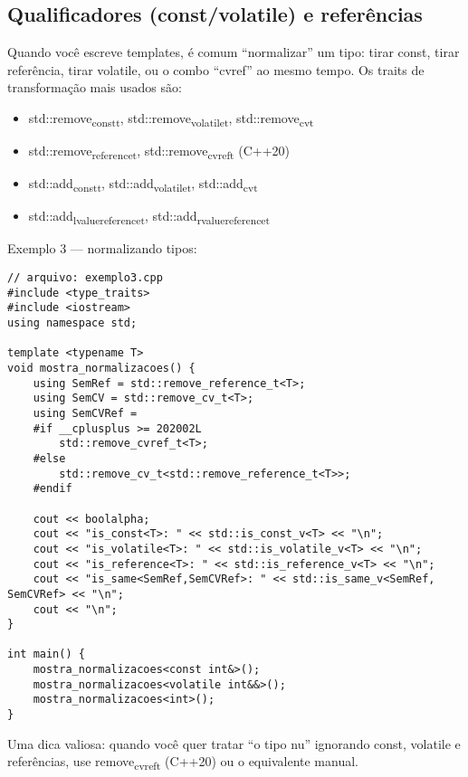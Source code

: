 \documentclass[11pt]{article}
\begin{document}
\subsection{Qualificadores (const/volatile) e referências}
\label{sec:org3db1790}

Quando você escreve templates, é comum “normalizar” um tipo: tirar const, tirar referência, tirar volatile, ou o combo “cvref” ao mesmo tempo. Os traits de transformação mais usados são:
\begin{itemize}
\item std::remove\textsubscript{const}\textsubscript{t}, std::remove\textsubscript{volatile}\textsubscript{t}, std::remove\textsubscript{cv}\textsubscript{t}
\item std::remove\textsubscript{reference}\textsubscript{t}, std::remove\textsubscript{cvref}\textsubscript{t} (C++20)
\item std::add\textsubscript{const}\textsubscript{t}, std::add\textsubscript{volatile}\textsubscript{t}, std::add\textsubscript{cv}\textsubscript{t}
\item std::add\textsubscript{lvalue}\textsubscript{reference}\textsubscript{t}, std::add\textsubscript{rvalue}\textsubscript{reference}\textsubscript{t}
\end{itemize}

Exemplo 3 — normalizando tipos:
\begin{verbatim}
// arquivo: exemplo3.cpp
#include <type_traits>
#include <iostream>
using namespace std;

template <typename T>
void mostra_normalizacoes() {
    using SemRef = std::remove_reference_t<T>;
    using SemCV = std::remove_cv_t<T>;
    using SemCVRef = 
    #if __cplusplus >= 202002L
        std::remove_cvref_t<T>;
    #else
        std::remove_cv_t<std::remove_reference_t<T>>;
    #endif

    cout << boolalpha;
    cout << "is_const<T>: " << std::is_const_v<T> << "\n";
    cout << "is_volatile<T>: " << std::is_volatile_v<T> << "\n";
    cout << "is_reference<T>: " << std::is_reference_v<T> << "\n";
    cout << "is_same<SemRef,SemCVRef>: " << std::is_same_v<SemRef, SemCVRef> << "\n";
    cout << "\n";
}

int main() {
    mostra_normalizacoes<const int&>();
    mostra_normalizacoes<volatile int&&>();
    mostra_normalizacoes<int>();
}
\end{verbatim}

Uma dica valiosa: quando você quer tratar “o tipo nu” ignorando const, volatile e referências, use remove\textsubscript{cvref}\textsubscript{t} (C++20) ou o equivalente manual.
\end{document}
